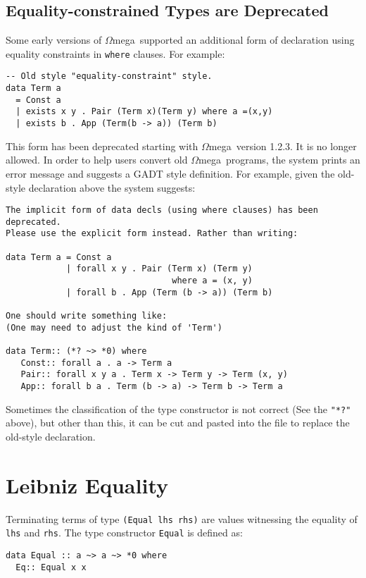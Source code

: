 \documentclass[11pt,twoside]{article}
\newcommand{\om}{$\Omega$mega}
\begin{document}
\subsection{Equality-constrained Types are Deprecated}
Some early versions of \om\ supported an additional form of declaration
using equality constraints in {\tt where} clauses. For example:
\begin{verbatim}
-- Old style "equality-constraint" style.
data Term a 
  = Const a
  | exists x y . Pair (Term x)(Term y) where a =(x,y)
  | exists b . App (Term(b -> a)) (Term b)
\end{verbatim}
This form has been deprecated starting with \om\ version 1.2.3. It is no longer
allowed. In order to help users convert old \om\ programs, the system
prints an error message and suggests a GADT style definition. For example,
given the old-style declaration above the system suggests:
\begin{verbatim}
The implicit form of data decls (using where clauses) has been deprecated.
Please use the explicit form instead. Rather than writing:

data Term a = Const a
            | forall x y . Pair (Term x) (Term y)
                                 where a = (x, y)
            | forall b . App (Term (b -> a)) (Term b)

One should write something like:
(One may need to adjust the kind of 'Term')

data Term:: (*? ~> *0) where
   Const:: forall a . a -> Term a
   Pair:: forall x y a . Term x -> Term y -> Term (x, y)
   App:: forall b a . Term (b -> a) -> Term b -> Term a
\end{verbatim}   
Sometimes the classification of the type constructor is not
correct (See the \verb+"*?"+ above), but other than this, it 
can be cut and pasted into the file to replace the old-style declaration.


\section{Leibniz Equality} \label{equal}

Terminating terms of type \verb+(Equal lhs rhs)+ are values witnessing the equality
of {\tt lhs} and {\tt rhs}. The type constructor {\tt Equal} is defined as:

\begin{verbatim}
data Equal :: a ~> a ~> *0 where
  Eq:: Equal x x
\end{verbatim}
\end{document}
